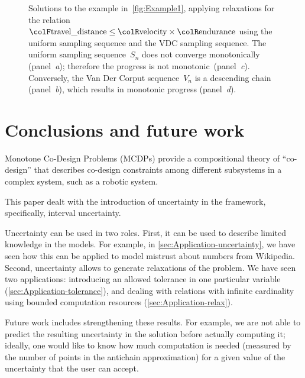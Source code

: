 \begin{center}
\begin{figure}[t]
\begin{centering}
{\begin{centering}
                                                                              \par
            \end{centering}
            }
            \par
        \end{centering}
        \caption{Solutions to the example in~\cref{fig:Example1}, applying relaxations
        for the relation ${\colF\text{travel\_distance}}\leq{\colR\text{velocity}}\times{\colR\text{endurance}}$
            using the uniform sampling sequence and the VDC sampling sequence.
            The uniform sampling sequence~$S_{n}$ does not converge monotonically
            (panel~\emph{a}); therefore the progress is not monotonic~(panel\emph{~c}).
            Conversely, the Van Der Corput sequence~$V_{n}$ is a descending
            chain (panel~\emph{b}), which results in monotonic progress (panel~\emph{d}).}
    \end{figure}
    \par
\end{center}


\section{Conclusions and future work}

Monotone Co-Design Problems (MCDPs) provide a compositional theory
of ``co-design'' that describes co-design constraints among different
subsystems in a complex system, such as a robotic system.

This paper dealt with the introduction of uncertainty in the framework,
specifically, interval uncertainty.

Uncertainty can be used in two roles. First, it can be used to describe
limited knowledge in the models. For example, in \cref{sec:Application-uncertainty},
we have seen how this can be applied to model mistrust about numbers
from Wikipedia. Second, uncertainty allows to generate relaxations
of the problem. We have seen two applications: introducing an allowed
tolerance in one particular variable (\cref{sec:Application-tolerance}),
and dealing with relations with infinite cardinality using bounded
computation resources (\cref{sec:Application-relax}).

Future work includes strengthening these results. For example, we
are not able to predict the resulting uncertainty in the solution
before actually computing it; ideally, one would like to know how
much computation is needed (measured by the number of points in the
antichain approximation) for a given value of the uncertainty that
the user can accept.


